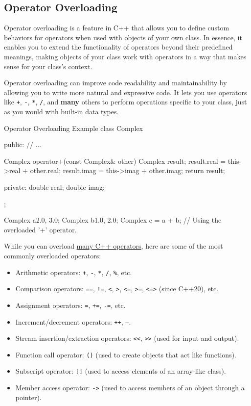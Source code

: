 \subsection{Operator Overloading}

Operator overloading is a feature in C++ that allows you to define custom behaviors for operators when used with objects of your own class. In essence, it enables you to extend the functionality of operators beyond their predefined meanings, making objects of your class work with operators in a way that makes sense for your class's context.

Operator overloading can improve code readability and maintainability by allowing you to write more natural and expressive code. It lets you use operators like \texttt{+}, \texttt{-}, \texttt{*}, \texttt{/}, and \textbf{many} others to perform operations specific to your class, just as you would with built-in data types.

\begin{neonlisting}[language=C++]{Operator Overloading Example}
class Complex {
public:
    // ...
    
    Complex operator+(const Complex& other) {
        Complex result;
        result.real = this->real + other.real;
        result.imag = this->imag + other.imag;
        return result;
    }

private:
    double real;
    double imag;
};

Complex a{2.0, 3.0};
Complex b{1.0, 2.0};
Complex c = a + b; // Using the overloaded '+' operator.
\end{neonlisting}

While you can overload \href{https://en.wikipedia.org/wiki/Operators_in_C_and_C%2B%2B}{many C++ operators}, here are some of the most commonly overloaded operators:

\begin{itemize}
    \item Arithmetic operators: \texttt{+}, \texttt{-}, \texttt{*}, \texttt{/}, \texttt{\%}, etc.
    \item Comparison operators: \texttt{==}, \texttt{!=}, \texttt{<}, \texttt{>}, \texttt{\textless=}, \texttt{\textgreater=}, \texttt{<=>} (since C++20), etc.
    \item Assignment operators: \texttt{=}, \texttt{+=}, \texttt{-=}, etc.
    \item Increment/decrement operators: \texttt{++}, \texttt{--}.
    \item Stream insertion/extraction operators: \texttt{<<}, \texttt{>>} (used for input and output).
    \item Function call operator: \texttt{()} (used to create objects that act like functions).
    \item Subscript operator: \texttt{[]} (used to access elements of an array-like class).
    \item Member access operator: \texttt{->} (used to access members of an object through a pointer).
\end{itemize}

